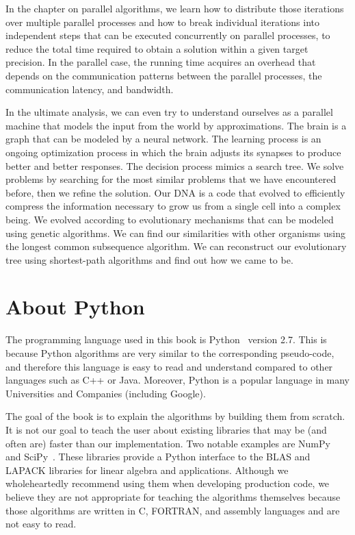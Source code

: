 \documentclass[justified,sixbynine]{tufte-book}
\theoremstyle{plain}%
\theoremstyle{definition}
\theoremstyle{remark}
\begin{document}
\begin{fullwidth}
In the chapter on parallel algorithms, we learn how to distribute those iterations over multiple parallel processes and how to break individual iterations into independent steps that can be executed concurrently on parallel processes, to reduce the total time required to obtain a solution within a given target precision. In the parallel case, the running time acquires an overhead that depends on the communication patterns between the parallel processes, the communication latency, and bandwidth.

In the ultimate analysis, we can even try to understand ourselves as a parallel machine that models the input from the world by approximations. The brain is a graph that can be modeled by a neural network. The learning process is an ongoing optimization process in which the brain adjusts its synapses to produce better and better responses. The decision process mimics a search tree. We solve problems by searching for the most similar problems that we have encountered before, then we refine the solution. Our DNA is a code that evolved to efficiently compress the information necessary to grow us from a single cell into a complex being. We evolved according to evolutionary mechanisms that can be modeled using genetic algorithms. We can find our similarities with other organisms using the longest common subsequence algorithm. We can reconstruct our evolutionary tree using shortest-path algorithms and find out how we came to be.

\section{About Python}

The programming language used in this book is Python~\cite{python} version 2.7. This is because Python algorithms are very similar to the corresponding pseudo-code, and therefore this language is easy to read and understand compared to other languages such as C++ or Java. Moreover, Python is a popular language in many Universities and Companies (including Google).

The goal of the book is to explain the algorithms by building them from scratch. It is not our goal to teach the user about existing libraries that may be (and often are) faster than our implementation. Two notable examples are NumPy~\cite{numpy} and SciPy~\cite{scipy}. These libraries provide a Python interface to the BLAS and LAPACK libraries for linear algebra and applications. Although we wholeheartedly recommend using them when developing production code, we believe they are not appropriate for teaching the algorithms themselves because those algorithms are written in C, FORTRAN, and assembly languages and are not easy to read.


\end{fullwidth}
\end{document}
